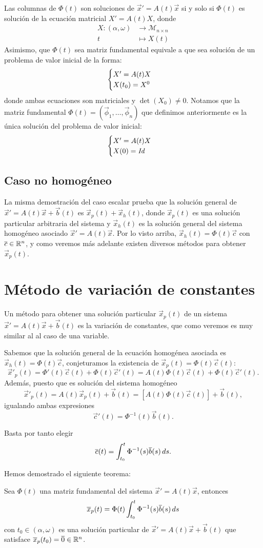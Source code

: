 \documentclass[../ecuaciones_diferenciales.tex]{subfiles}
\begin{document}
Las columnas de \(\Phi(t)\) son soluciones de \(\vec{x}' = A(t)\vec{x}\) si y 
solo si \(\Phi(t)\) es solución de la ecuación matricial \(X' = A(t)X\), donde
\begin{align*}
	X : (\alpha, \omega) & \to \mathcal{M}_{n \times n} \\
	t                    & \mapsto X(t)
\end{align*}
Asimismo, que \(\Phi(t)\) sea matriz fundamental equivale a que sea solución de
un problema de valor inicial de la forma:
\[\begin{cases}X' = A(t)X \\ X(t_0) = X^0\end{cases}\]
donde ambas ecuaciones son matriciales y \(\det(X_0) \neq 0\). Notamos que la
matriz fundamental \(\Phi(t) = (\vec{\phi}_1, \dots, \vec{\phi}_n)\) que 
definimos anteriormente es la única solución del problema de valor inicial:
\[\begin{cases}X' = A(t)X \\ X(0) = \mathit{Id}\end{cases}\]

\subsection{Caso no homogéneo}

La misma demostración del caso escalar prueba que la solución general de
\(\vec{x}' = A(t)\vec{x} + \vec{b}(t)\) es \(\vec{x}_p(t) + \vec{x}_h(t)\), 
donde \(\vec{x}_p(t)\) es una solución particular arbitraria del sistema y 
\(\vec{x}_h(t)\) es la solución general del sistema homogéneo asociado 
\(\vec{x}' = A(t)\vec{x}\). Por lo visto arriba,
\(\vec{x}_h(t) = \Phi(t)\vec{c}\) con \(\overline{c} \in \mathbb{R}^n\), y como veremos más 
adelante existen diversos métodos para obtener \(\vec{x}_p(t)\).

\section{Método de variación de constantes}

Un método para obtener una solución particular \(\vec{x}_p(t)\) de un sistema
\(\vec{x}' = A(t)\vec{x} + \vec{b}(t)\) es la variación de constantes, que como
veremos es muy similar al al caso de una variable. 

Sabemos que la solución general de la ecuación homogénea asociada es 
\(\vec{x}_h(t) = \Phi(t)\vec{c}\), conjeturamos la existencia
de \(\vec{x}_p(t) = \Phi(t)\vec{c}(t)\):
\[\vec{x}'_p(t) 
	= \Phi'(t) \vec{c}(t) + \Phi(t) \vec{c}'(t) 
	= A(t)\Phi(t) \vec{c}(t) + \Phi(t) \vec{c}'(t).\]
Además, puesto que es solución del sistema homogéneo
\[\vec{x}'_p(t) = A(t)\vec{x}_p(t) + \vec{b}(t) 
	= [A(t) \Phi(t) \vec{c}(t)] + \vec{b}(t),\]
igualando ambas expresiones
\[\vec{c}'(t) = \Phi^{-1}(t) \vec{b}(t).\]

Basta por tanto elegir 
\[\overline{c}(t) = \int_{t_0}^t \Phi^{-1}(s) \overline{b}(s) \mathop{d\!} s.\]

Hemos demostrado el siguiente teorema:

\begin{theorem}
	Sea \(\Phi(t)\) una matriz fundamental del sistema 
	\(\vec{x}' = A(t)\vec{x}\), entonces
	\[\overline{x}_p(t) = \Phi(t) \int_{t_0}^t \Phi^{-1}(s) \overline{b}(s) \mathop{d\!} s\]
	con \(t_0 \in (\alpha, \omega)\) es una solución particular de
	\(\vec{x}' = A(t)\vec{x} + \vec{b}(t)\) que satisface 
	\(\overline{x}_p(t_0) = \overline{0} \in \mathbb{R}^n\).
\end{theorem}
\end{document}
